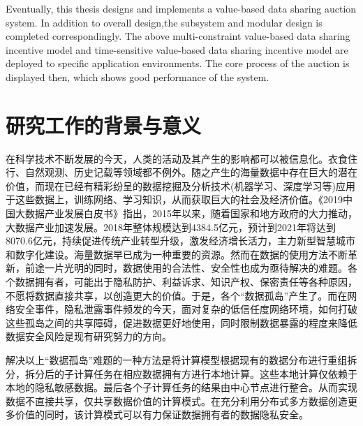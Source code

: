 \documentclass[promaster]{thesis-uestc}
\begin{document}
\begin{englishabstract}
Eventually, this thesis designs and implements a value-based data sharing auction system. In addition to overall design,the subsystem and modular design is completed correspondingly. The above multi-constraint value-based data sharing incentive model and time-sensitive value-based data sharing incentive model are deployed to specific application environments. The core process of the auction is displayed then, which shows good performance of the system.

\end{englishabstract}

\thesistableofcontents

\thesischapterexordium

\section{研究工作的背景与意义}

在科学技术不断发展的今天，人类的活动及其产生的影响都可以被信息化。衣食住行、自然观测、历史记载等领域都不例外。随之产生的海量数据中存在巨大的潜在价值，而现在已经有精彩纷呈的数据挖掘及分析技术(机器学习、深度学习等)应用于这些数据上，训练网络、学习知识，从而获取巨大的社会及经济价值。《2019中国大数据产业发展白皮书》指出，2015年以来，随着国家和地方政府的大力推动，大数据产业加速发展。2018年整体规模达到4384.5亿元，预计到2021年将达到8070.6亿元，持续促进传统产业转型升级，激发经济增长活力，主力新型智慧城市和数字化建设。海量数据早已成为一种重要的资源。然而在数据的使用方法不断革新，前途一片光明的同时，数据使用的合法性、安全性也成为亟待解决的难题。各个数据拥有者，可能出于隐私防护、利益诉求、知识产权、保密责任等各种原因，不愿将数据直接共享，以创造更大的价值。于是，各个“数据孤岛”产生了。而在网络安全事件，隐私泄露事件频发的今天，面对复杂的低信任度网络环境，如何打破这些孤岛之间的共享障碍，促进数据更好地使用，同时限制数据暴露的程度来降低数据安全风险是现有研究努力的方向。

解决以上“数据孤岛”难题的一种方法是将计算模型根据现有的数据分布进行重组拆分，拆分后的子计算任务在相应数据拥有方进行本地计算。这些本地计算仅依赖于本地的隐私敏感数据。最后各个子计算任务的结果由中心节点进行整合。从而实现数据不直接共享，仅共享数据价值的计算模式。在充分利用分布式多方数据创造更多价值的同时，该计算模式可以有力保证数据拥有者的数据隐私安全。

\end{document}
